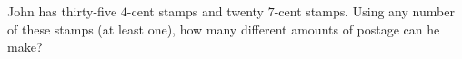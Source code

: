John has thirty-five $4$-cent stamps and twenty $7$-cent stamps. Using any number of these stamps (at least one), how many different amounts of postage can he make?
